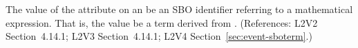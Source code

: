 The value of the  attribute on an \Event {} be an SBO
identifier referring to a mathematical expression.  That is, the value 
be a term derived from \sbointeraction.  (References: L2V2 Section~4.14.1; L2V3
Section~4.14.1; L2V4 Section~\ref{sec:event-sboterm}.)

